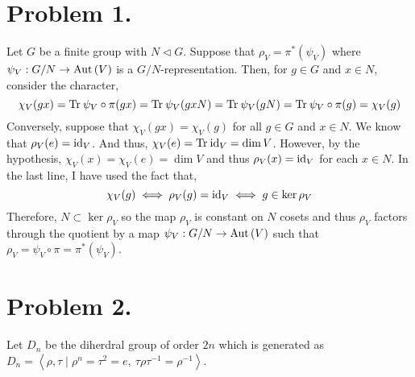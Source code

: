 \documentclass[12pt]{extarticle}
\begin{document}

\section*{Problem 1.}

Let $G$ be a finite group with $N \triangleleft G$. Suppose that $\rho_V = \pi^*(\psi_V)$ where $\psi_V : G/N \to \mathrm{Aut}\left( V \right)$ is a $G/N$-representation. Then, for $g \in G$ and $x \in N$, consider the character,
\[ \chi_V(gx) = \mathrm{Tr} \: \psi_V \circ \pi(gx) = \mathrm{Tr} \: \psi_V(gx N) = \mathrm{Tr} \: \psi_V(gN) = \mathrm{Tr} \: \psi_V \circ \pi(g) = \chi_V(g) \]
Conversely, suppose that $\chi_V(gx) = \chi_V(g)$ for all $g \in G$ and $x \in N$. We know that $\rho_V(e) = \mathrm{id}_V$. And thus, $\chi_V(e) = \mathrm{Tr} \: \mathrm{id}_V = \dim{V}$. However, by the hypothesis, $\chi_V(x) = \chi_V(e) = \dim{V}$ and thus $\rho_V(x) = \mathrm{id}_V$ for each $x \in N$. In the last line, I have used the fact that,
\[ \chi_V(g) \iff \rho_V(g) = \mathrm{id}_V \iff g \in \ker{\rho_V} \]
Therefore, $N \subset \ker{\rho_V}$ so the map $\rho_V$ is constant on $N$ cosets and thus $\rho_V$ factors through the quotient by a map $\psi_V : G/N \to \mathrm{Aut}\left( V \right)$ such that $\rho_V = \psi_V \circ \pi = \pi^*(\psi_V)$.  


\section*{Problem 2.}
Let $D_n$ be the diherdral group of order $2n$ which is generated as $D_n = \left< \rho, \tau \mid \rho^n = \tau^2 = e, \: \tau \rho \tau^{-1} = \rho^{-1} \right>$.
 
\end{document}
